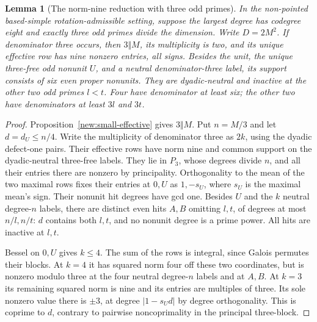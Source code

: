 \documentclass[11pt]{amsart}
\numberwithin{equation}{section}
\newtheorem{lemma}[theorem]{Lemma}
\theoremstyle{definition}
\theoremstyle{plain}
\begin{document}
\begin{lemma}[The norm-nine reduction with three odd primes]
\label{ext:eight-nine}
In the non-pointed based-simple rotation-admissible setting, suppose
the largest degree has codegree eight and exactly three odd primes
divide the dimension. Write $D=2M^2$.  If denominator three
occurs, then $3\Vert M$, its multiplicity is two, and its unique
effective row has nine nonzero entries, all signs.  Besides the
unit, the unique three-free odd nonunit $U$, and a neutral
denominator-three label, its support consists of six even proper
nonunits.  They are dyadic-neutral and inactive at the other two
odd primes $l<t$.  Four have denominator at least six; the other
two have denominators at least $3l$ and $3t$.
\end{lemma}
\begin{proof}
Proposition~\ref{new:small-effective} gives $3\Vert M$.
Put $n=M/3$ and let $d=d_U\le n/4$.  Write the multiplicity of
denominator three as $2k$, using the dyadic defect-one pairs.
Their effective rows have norm nine and common support on the
dyadic-neutral three-free labels.  They lie in $P_3$, whose degrees
divide $n$, and all their entries there are nonzero by principality.
Orthogonality to the mean of the two maximal rows fixes their entries
at $0,U$ as $1,-s_U$, where $s_U$ is the maximal mean's sign.
Their nonunit hit degrees have gcd one.  Besides $U$ and the $k$
neutral degree-$n$ labels, there are distinct even hits $A,B$ omitting
$l,t$, of degrees at most $n/l,n/t$: $d$ contains both $l,t$, and
no nonunit degree is a prime power.  All hits are inactive at $l,t$.

Bessel on $0,U$ gives $k\le4$.  The sum of the rows is integral,
since Galois permutes their blocks.  At $k=4$ it has squared norm
four off these two coordinates, but is nonzero modulo three at the
four neutral degree-$n$ labels and at $A,B$.  At $k=3$ its remaining
squared norm is nine and its entries are multiples of three.  Its
sole nonzero value there is $\pm3$, at degree $|1-s_Ud|$ by degree
orthogonality.  This is coprime to $d$, contrary to pairwise
noncoprimality in the principal three-block.


\end{proof}
\end{document}
